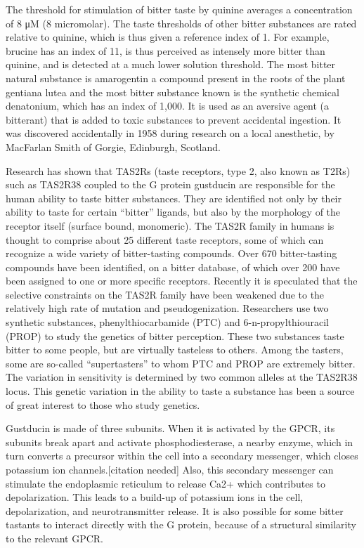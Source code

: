 \documentclass[]{book}
\begin{document}
The threshold for stimulation of bitter taste by quinine averages a concentration of 8 μM (8 micromolar). The taste thresholds of other bitter substances are rated relative to quinine, which is thus given a reference index of 1. For example, brucine has an index of 11, is thus perceived as intensely more bitter than quinine, and is detected at a much lower solution threshold. The most bitter natural substance is amarogentin a compound present in the roots of the plant gentiana lutea and the most bitter substance known is the synthetic chemical denatonium, which has an index of 1,000. It is used as an aversive agent (a bitterant) that is added to toxic substances to prevent accidental ingestion. It was discovered accidentally in 1958 during research on a local anesthetic, by MacFarlan Smith of Gorgie, Edinburgh, Scotland.

Research has shown that TAS2Rs (taste receptors, type 2, also known as T2Rs) such as TAS2R38 coupled to the G protein gustducin are responsible for the human ability to taste bitter substances. They are identified not only by their ability to taste for certain ``bitter'' ligands, but also by the morphology of the receptor itself (surface bound, monomeric). The TAS2R family in humans is thought to comprise about 25 different taste receptors, some of which can recognize a wide variety of bitter-tasting compounds. Over 670 bitter-tasting compounds have been identified, on a bitter database, of which over 200 have been assigned to one or more specific receptors. Recently it is speculated that the selective constraints on the TAS2R family have been weakened due to the relatively high rate of mutation and pseudogenization. Researchers use two synthetic substances, phenylthiocarbamide (PTC) and 6-n-propylthiouracil (PROP) to study the genetics of bitter perception. These two substances taste bitter to some people, but are virtually tasteless to others. Among the tasters, some are so-called ``supertasters'' to whom PTC and PROP are extremely bitter. The variation in sensitivity is determined by two common alleles at the TAS2R38 locus. This genetic variation in the ability to taste a substance has been a source of great interest to those who study genetics.

Gustducin is made of three subunits. When it is activated by the GPCR, its subunits break apart and activate phosphodiesterase, a nearby enzyme, which in turn converts a precursor within the cell into a secondary messenger, which closes potassium ion channels.{[}citation needed{]} Also, this secondary messenger can stimulate the endoplasmic reticulum to release Ca2+ which contributes to depolarization. This leads to a build-up of potassium ions in the cell, depolarization, and neurotransmitter release. It is also possible for some bitter tastants to interact directly with the G protein, because of a structural similarity to the relevant GPCR.
\end{document}
